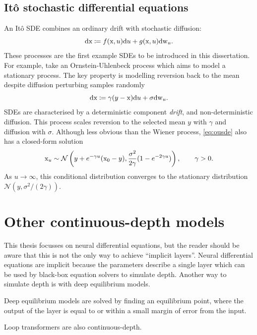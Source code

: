 \subsection{It\^o stochastic differential equations}
An It\^o \ac{SDE} combines an ordinary drift with stochastic diffusion:
\[
\mathrm{d} {\textnormal{x}} \coloneqq f({\textnormal{x}},u)\mathrm{d} u + g({\textnormal{x}},u)\mathrm{d} {\textnormal{w}}_u.
\]
These processes are the first example \acp{SDE} to be introduced in this dissertation. For example, take an Ornstein-Uhlenbeck process which aims to model a stationary process. The key property is modelling reversion back to the mean despite diffusion perturbing samples randomly
\[
\mathrm{d} {\textnormal{x}} \coloneqq \gamma(y - {\textnormal{x}})\mathrm{d} u + \sigma\mathrm{d} {\textnormal{w}}_u.
\label{eq:ousde}
\]
\acp{SDE} are characterised by a deterministic component \textit{drift}, and non-deterministic diffusion. This process scales reversion to the selected mean $y$ with $\gamma$ and diffusion with $\sigma$. Although less obvious than the Wiener process, \eqref{eq:ousde} also has a closed-form solution
\[
{\textnormal{x}}_u\sim\mathcal N\left(y+e^{-\gamma u}({\textnormal{x}}_0-y),\frac{\sigma^2}{2\gamma}(1-e^{-2\gamma u})\right),\qquad \gamma>0.
\]
As $u\to\infty$, this conditional distribution converges to the stationary distribution $\mathcal N(y,\sigma^2/(2\gamma))$.

\section{Other continuous-depth models}
This thesis focusses on neural differential equations, but the reader should be aware that this is not the only way to achieve ``implicit layers''. Neural differential equations are implicit because the parameters describe a single layer which can be used by black-box equation solvers to simulate depth. Another way to simulate depth is with deep equilibrium models.

Deep equilibrium models are solved by finding an equilibrium point, where the output of the layer is equal to or within a small margin of error from the input.

Loop transformers are also continuous-depth.
